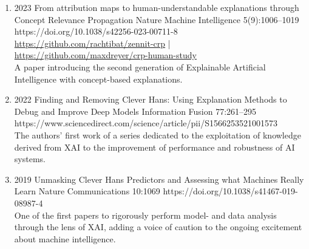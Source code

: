         \begin{enumerate}
            \item
                            {2023}
                            {From attribution maps to human-understandable explanations through Concept Relevance Propagation}
                            {Nature Machine Intelligence}
                            {5(9):1006--1019}
                            {https://doi.org/10.1038/s42256-023-00711-8}
                            {   \\
                                \href{https://github.com/rachtibat/zennit-crp}{https://github.com/rachtibat/zennit-crp} |
                                \href{https://github.com/maxdreyer/crp-human-study}{https://github.com/maxdreyer/crp-human-study}\\
                                A paper introducing the second generation of Explainable Artificial Intelligence with concept-based explanations.
                            }


            \item
                            {2022}
                            {Finding and Removing Clever Hans: Using Explanation Methods to Debug and Improve Deep Models}
                            {Information Fusion}
                            {77:261--295}
                            {https://www.sciencedirect.com/science/article/pii/S1566253521001573}
                            {\\
                            The authors' first work of a series dedicated to the exploitation of knowledge derived from XAI to the improvement of performance and robustness of AI systems.}


            \item
                            {2019}
                            {Unmasking Clever Hans Predictors and Assessing what Machines Really Learn}
                            {Nature Communications}
                            {10:1069}
                            {https://doi.org/10.1038/s41467-019-08987-4}
                            {\\
                            One of the first papers to rigorously
                            perform model- and data analysis through the lens of XAI, adding a voice of caution to the ongoing excitement about machine intelligence.}



\end{enumerate}
